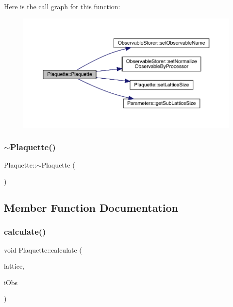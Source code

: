 Here is the call graph for this function\+:
\nopagebreak
\begin{figure}[H]
\begin{center}
\leavevmode
\includegraphics[width=350pt]{class_plaquette_a1c87b43fc7ee74b2b0289de63e03bb61_cgraph}
\end{center}
\end{figure}
\mbox{\label{class_plaquette_a8730cb08bee0e0f9260bf8f11f52b8c0}} 
\subsubsection{\texorpdfstring{$\sim$Plaquette()}{~Plaquette()}}
{\footnotesize\ttfamily Plaquette\+::$\sim$\+Plaquette (\begin{DoxyParamCaption}{ }\end{DoxyParamCaption})}



\subsection{Member Function Documentation}
\mbox{\label{class_plaquette_a40cae6fd587c14836bdf61e69c615a00}} 
\subsubsection{\texorpdfstring{calculate()}{calculate()}}
{\footnotesize\ttfamily void Plaquette\+::calculate (\begin{DoxyParamCaption}\item[{\mbox{\hyperlink{class_lattice}{Lattice}}$<$ \mbox{\hyperlink{class_s_u3}{S\+U3}} $>$ $\ast$}]{lattice,  }\item[{unsigned int}]{i\+Obs }\end{DoxyParamCaption})\hspace{0.3cm}{\ttfamily [virtual]}}



